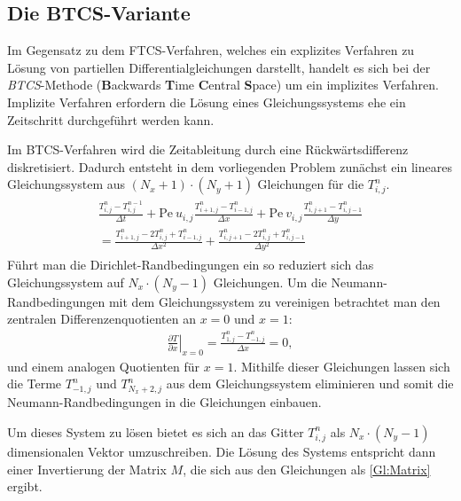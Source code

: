 \subsection{Die BTCS-Variante}
Im Gegensatz zu dem FTCS-Verfahren, welches ein explizites Verfahren zu Lösung von partiellen Differentialgleichungen darstellt, handelt es sich bei der \emph{BTCS}-Methode (\textbf{B}ackwards \textbf{T}ime \textbf{C}entral \textbf{S}pace) um ein implizites Verfahren.
Implizite Verfahren erfordern die Lösung eines Gleichungssystems ehe ein Zeitschritt durchgeführt werden kann.

Im BTCS-Verfahren wird die Zeitableitung durch eine Rückwärtsdifferenz diskretisiert. Dadurch entsteht in dem vorliegenden Problem zunächst ein lineares Gleichungssystem aus $(N_x+1)\cdot (N_y+1)$ Gleichungen für die $T^n_{i,j}$.
\begin{align}
  \begin{split}
  \frac{T^{n}_{i,j}-T^{n-1}_{i,j}}{\Delta t} + \text{Pe}~ u_{i,j} \frac{T^{n}_{i+1,j}-T^{n}_{i-1,j}}{\Delta x} + \text{Pe}~ v_{i,j} \frac{T^{n}_{i,j+1}-T^{n}_{i,j-1}}{\Delta y}\\
   =  \frac{T^{n}_{i+1,j}-2T^{n}_{i,j}+T^{n}_{i-1,j}}{\Delta x^2} +\frac{T^{n}_{i,j+1}-2T^{n}_{i,j}+T^{n}_{i,j-1}}{\Delta y^2}
 \end{split}\label{Gl:BTCS}
\end{align}
Führt man die Dirichlet-Randbedingungen ein so reduziert sich das Gleichungssystem auf $N_x \cdot (N_y-1)$ Gleichungen. Um die Neumann-Randbedingungen mit dem Gleichungssystem zu vereinigen betrachtet man den zentralen Differenzenquotienten an $x=0$ und $x=1$:
\begin{align}
  \left. \frac{\partial T}{\partial x}\right|_{x=0} = \frac{T^{n}_{1,j}-T^{n}_{-1,j}}{\Delta x} = 0, \nonumber
\end{align}
und einem analogen Quotienten für $x=1$. Mithilfe dieser Gleichungen lassen sich die Terme $T^{n}_{-1,j}$ und $T^{n}_{N_x+2,j}$ aus dem Gleichungssystem eliminieren und somit die Neumann-Randbedingungen in die Gleichungen einbauen.

Um dieses System zu lösen bietet es sich an das Gitter $T^n_{i,j}$ als $N_x \cdot (N_y-1)$ dimensionalen Vektor umzuschreiben.
Die Lösung des Systems entspricht dann einer Invertierung der Matrix $M$, die sich aus den Gleichungen als \cref{Gl:Matrix} ergibt.

